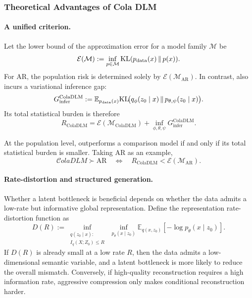 \subsubsection{Theoretical Advantages of Cola DLM}
\label{sec:theory_advantage}

\paragraph{\textbf{A unified criterion.}}
Let the lower bound of the approximation error for a model family \(\mathcal M\) be
\begin{equation}
\mathcal E(\mathcal M):=\inf_{p\in\mathcal M}\mathrm{KL}(p_{\mathrm{data}}(x)\,\|\,p(x)).
\label{eq:main_model_error}
\end{equation}
For AR, the population risk is determined solely by \(\mathcal E(\mathcal M_{\mathrm{AR}})\). In contrast, \method also incurs a variational inference gap:
\begin{equation}
G_{\mathrm{infer}}^{\mathrm{ColaDLM}}
:=
\mathbb E_{p_{\mathrm{data}}(x)}
\mathrm{KL}\!\bigl(q_\phi(z_0\mid x)\,\|\,p_{\theta,\psi}(z_0\mid x)\bigr).
\label{eq:main_infer_gap}
\end{equation}
Its total statistical burden is therefore
\begin{equation}
R_{\mathrm{ColaDLM}}
=
\mathcal E(\mathcal M_{\mathrm{ColaDLM}})
+
\inf_{\phi,\theta,\psi}G_{\mathrm{infer}}^{\mathrm{ColaDLM}}.
\label{eq:main_total_burden}
\end{equation}

\begin{proposition}
At the population level, \method outperforms a comparison model if and only if its total statistical burden is smaller. Taking AR as an example,
\begin{equation}
\mathcal{C}olaDLM \succ \mathrm{AR}
\quad\Longleftrightarrow\quad
R_{\mathrm{ColaDLM}}<\mathcal{E}(\mathcal{M}_{\mathrm{AR}}).
\label{eq:main_unified_criterion}
\end{equation}
\end{proposition}

\paragraph{\textbf{Rate-distortion and structured generation.}}
Whether a latent bottleneck is beneficial depends on whether the data admits a low-rate but informative global representation. Define the representation rate-distortion function as
\begin{equation}
D(R)
:=
\inf_{\substack{q(z_0\mid x):\\ I_q(X;Z_0)\le R}}
\ \inf_{p_\theta(x\mid z_0)}
\mathbb E_{q(x,z_0)}[-\log p_\theta(x\mid z_0)].
\label{eq:main_rate_distortion}
\end{equation}
If \(D(R)\) is already small at a low rate \(R\), then the data admits a low-dimensional semantic variable, and a latent bottleneck is more likely to reduce the overall mismatch. Conversely, if high-quality reconstruction requires a high information rate, aggressive compression only makes conditional reconstruction harder.

